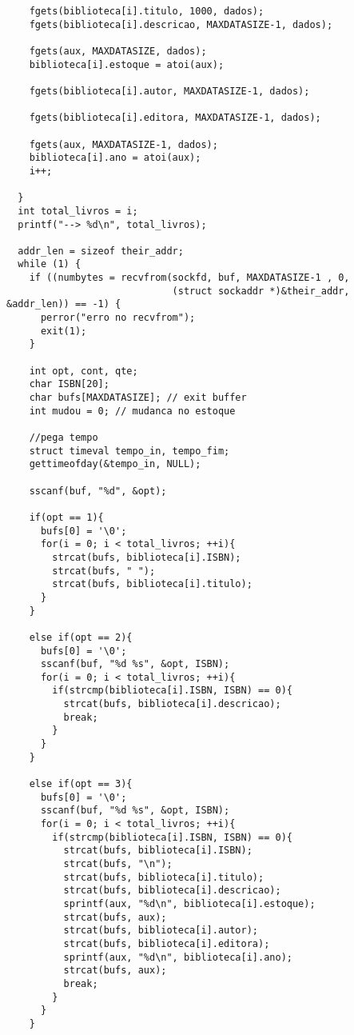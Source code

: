 \documentclass[11pt, brazil]{article} %
\begin{document}
\begin{verbatim}
    fgets(biblioteca[i].titulo, 1000, dados);
    fgets(biblioteca[i].descricao, MAXDATASIZE-1, dados);
		
    fgets(aux, MAXDATASIZE, dados);
    biblioteca[i].estoque = atoi(aux);
		
    fgets(biblioteca[i].autor, MAXDATASIZE-1, dados);
		
    fgets(biblioteca[i].editora, MAXDATASIZE-1, dados);
		
    fgets(aux, MAXDATASIZE-1, dados);
    biblioteca[i].ano = atoi(aux);
    i++;
		
  }
  int total_livros = i;
  printf("--> %d\n", total_livros);

  addr_len = sizeof their_addr;
  while (1) {
    if ((numbytes = recvfrom(sockfd, buf, MAXDATASIZE-1 , 0,
                             (struct sockaddr *)&their_addr, &addr_len)) == -1) {
      perror("erro no recvfrom");
      exit(1);
    }

    int opt, cont, qte;
    char ISBN[20];
    char bufs[MAXDATASIZE]; // exit buffer		    	
    int mudou = 0; // mudanca no estoque
		    	
    //pega tempo
    struct timeval tempo_in, tempo_fim;
    gettimeofday(&tempo_in, NULL);
		    	
    sscanf(buf, "%d", &opt);
		    	
    if(opt == 1){
      bufs[0] = '\0';
      for(i = 0; i < total_livros; ++i){
        strcat(bufs, biblioteca[i].ISBN);
        strcat(bufs, " ");
        strcat(bufs, biblioteca[i].titulo);
      }
    }
		    	
    else if(opt == 2){
      bufs[0] = '\0';
      sscanf(buf, "%d %s", &opt, ISBN);
      for(i = 0; i < total_livros; ++i){
        if(strcmp(biblioteca[i].ISBN, ISBN) == 0){
          strcat(bufs, biblioteca[i].descricao);
          break;
        }		    				
      }
    }
		    	
    else if(opt == 3){
      bufs[0] = '\0';
      sscanf(buf, "%d %s", &opt, ISBN);
      for(i = 0; i < total_livros; ++i){
        if(strcmp(biblioteca[i].ISBN, ISBN) == 0){
          strcat(bufs, biblioteca[i].ISBN);
          strcat(bufs, "\n");
          strcat(bufs, biblioteca[i].titulo);
          strcat(bufs, biblioteca[i].descricao);
          sprintf(aux, "%d\n", biblioteca[i].estoque);
          strcat(bufs, aux);
          strcat(bufs, biblioteca[i].autor);
          strcat(bufs, biblioteca[i].editora);
          sprintf(aux, "%d\n", biblioteca[i].ano);
          strcat(bufs, aux);
          break;
        }		    				
      }
    }
		    

\end{verbatim}
\end{document}
